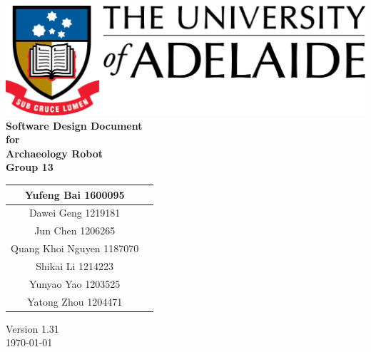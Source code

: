 \begin{center}
\includegraphics[scale=1.5]{./UniLogo}\\[1cm]    
\textbf{\Huge \bfseries Software Design Document}\\[1.5cm]
\textbf{\huge for}\\[0.5cm]


\textbf{ \huge Archaeology Robot }\\[0.3cm]
\textbf{ \huge Group 13 }\\[2cm]


\begin{tabular}{ |c | p{2cm} |}
	\hline
Yufeng Bai 1600095 & \\[.5cm] \hline
Dawei Geng 1219181 & \\[.5cm] \hline
Jun Chen 1206265 & \\[.5cm] \hline
Quang Khoi Nguyen 1187070  & \\[.5cm] \hline
Shikai Li 1214223 & \\[.5cm] \hline
Yunyao Yao 1203525 & \\[.5cm] \hline
Yatong Zhou 1204471 & \\[.5cm] \hline
\end{tabular}


\vfill

Version 1.31 \\ [0.2cm]
{\large \today}

\end{center}

